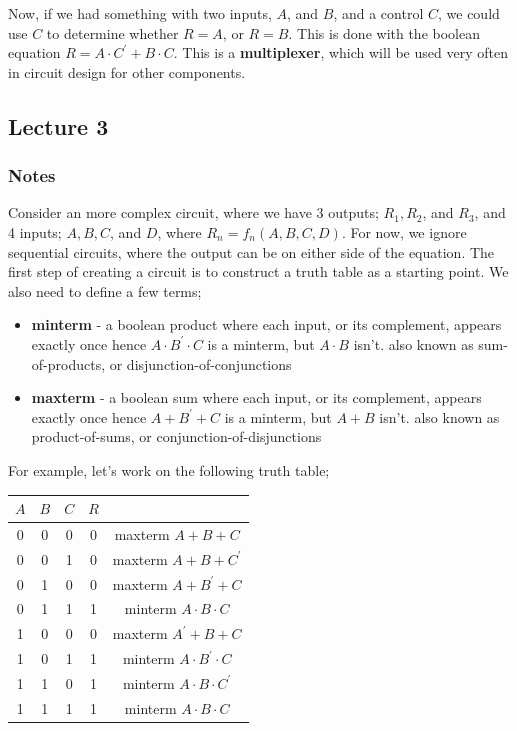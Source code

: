 \documentclass[a4paper, 12pt]{article}
\begin{document}
                Now, if we had something with two inputs, $A$, and $B$, and a control $C$, we could use $C$ to determine whether $R = A$, or $R = B$. This is done with the boolean equation $R = A \cdot C^\prime + B \cdot C$. This is a \textbf{multiplexer}, which will be used very often in circuit design for other components.
        \subsection*{Lecture 3}
            \subsubsection*{Notes}
                Consider an more complex circuit, where we have 3 outputs; $R_1, R_2$, and $R_3$, and 4 inputs; $A, B, C$, and $D$, where $R_n=f_n(A, B, C, D)$. For now, we ignore sequential circuits, where the output can be on either side of the equation. The first step of creating a circuit is to construct a truth table as a starting point. We also need to define a few terms;
                \begin{itemize}
                    \itemsep0em
                    \item \textbf{minterm} - a boolean product where each input, or its complement, appears exactly once
                        \subitem hence $A \cdot B^\prime \cdot C$ is a minterm, but $A \cdot B$ isn't.
                        \subitem also known as sum-of-products, or disjunction-of-conjunctions
                    \item \textbf{maxterm} - a boolean sum where each input, or its complement, appears exactly once
                        \subitem hence $A + B^\prime + C$ is a minterm, but $A + B$ isn't.
                        \subitem also known as product-of-sums, or conjunction-of-disjunctions
                \end{itemize}
                For example, let's work on the following truth table;
                \begin{center}
                    \begin{tabular}{c|c|c|c|c}
                        $A$ & $B$ & $C$ & $R$ & \\
                        \hline
                        0 & 0 & 0 & 0 & maxterm $A + B + C$ \\
                        0 & 0 & 1 & 0 & maxterm $A + B + C^\prime$ \\
                        0 & 1 & 0 & 0 & maxterm $A + B^\prime + C$ \\
                        0 & 1 & 1 & 1 & minterm $A \cdot B \cdot C$ \\
                        1 & 0 & 0 & 0 & maxterm $A^\prime + B + C$ \\
                        1 & 0 & 1 & 1 & minterm $A \cdot B^\prime \cdot C$ \\
                        1 & 1 & 0 & 1 & minterm $A \cdot B \cdot C^\prime$ \\
                        1 & 1 & 1 & 1 & minterm $A \cdot B \cdot C$
                    \end{tabular}
                \end{center}
\end{document}
